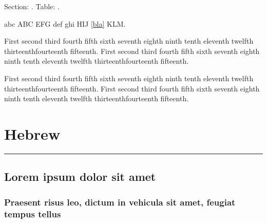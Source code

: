 \documentclass[a4paper]{book}
\begin{document}
Section: \thesection. Table: \thetable.

\bigskip

abc \foreignlanguage{hebrew}{ABC  EFG} def
 ghi \foreignlanguage{hebrew}{HIJ \ref{bla} KLM}. 

\bigskip

{\raggedright First second third fourth fifth sixth seventh eighth
ninth tenth eleventh twelfth thirteenthfourteenth fifteenth. First
second third fourth fifth sixth seventh eighth ninth tenth eleventh
twelfth thirteenthfourteenth fifteenth.\par}

\bigskip

{\raggedleft First second third fourth fifth sixth seventh eighth
ninth tenth eleventh twelfth thirteenthfourteenth fifteenth. First
second third fourth fifth sixth seventh eighth ninth tenth eleventh
twelfth thirteenthfourteenth fifteenth.\par}

\newpage


\chapter{Hebrew}

\hrule

\bigskip

\section{Lorem ipsum dolor sit amet}
\tracingnone
\label{bla}

\subsection{Praesent risus leo, dictum in vehicula sit amet, feugiat
tempus tellus}
\end{document}
